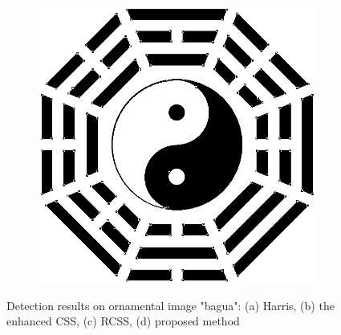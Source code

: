 \documentclass{article}
\begin{document}
\begin{figure}[h]
\begin{subfigure}[b]{0.24\linewidth}
      \caption{}
    \end{subfigure}
         \begin{subfigure}[b]{0.24\linewidth}
      \includegraphics[width=\linewidth]{experiments/bagua_final.png}
      \caption{}
    \end{subfigure}
        \caption{Detection results on ornamental image "bagua": (a) Harris, (b) the enhanced CSS, (c) RCSS, (d) proposed method}
    \label{Results on Planar Curves}
  \end{figure}
\end{document}
